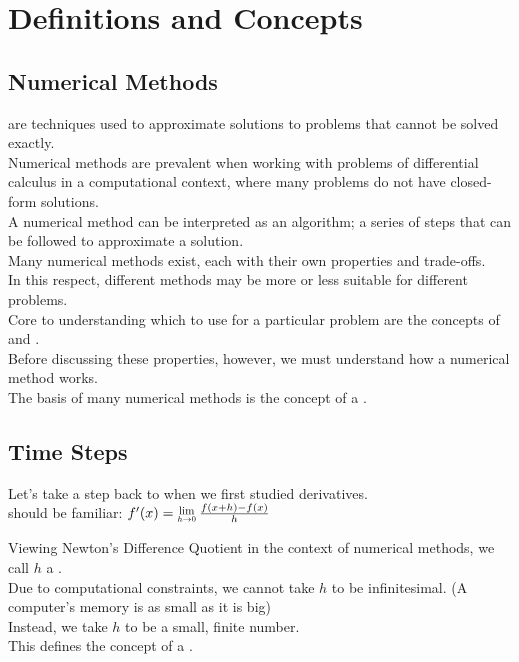 \section{Definitions and Concepts}

\subsection{Numerical Methods}
\par {} are techniques used to approximate solutions to problems that cannot be solved exactly.\\
Numerical methods are prevalent when working with problems of differential calculus in a computational context, where many problems do not have closed-form solutions.\\
A numerical method can be interpreted as an algorithm; a series of steps that can be followed to approximate a solution.\\
Many numerical methods exist, each with their own properties and trade-offs.\\
In this respect, different methods may be more or less suitable for different problems.\\
Core to understanding which to use for a particular problem are the concepts of  and .\\
Before discussing these properties, however, we must understand how a numerical method works.\\
The basis of many numerical methods is the concept of a .

\subsection{Time Steps}
Let's take a step back to when we first studied derivatives.\\
 should be familiar: 
$f'(x) = \Lim{h \to 0} \frac{f(x+h) - f(x)}{h}$

\par Viewing Newton's Difference Quotient in the context of numerical methods, we call $h$ a .\\
Due to computational constraints, we cannot take $h$ to be infinitesimal. (A computer's memory is as small as it is big)\\
Instead, we take $h$ to be a small, finite number.\\
This defines the concept of a .\\

